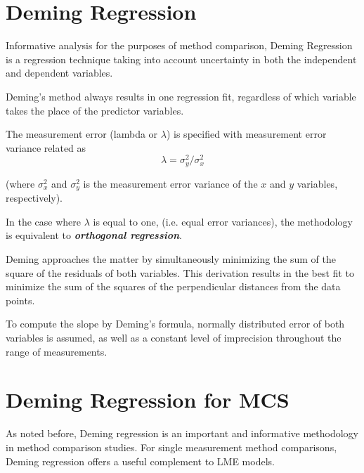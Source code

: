 \documentclass[12pt, a4paper]{report}
\theoremstyle{plain}
\theoremstyle{definition}
\theoremstyle{remark}
\begin{document}
\section{Deming Regression}

Informative analysis for the purposes of method comparison, Deming Regression is a regression technique taking into account uncertainty in both the independent and dependent variables.

Deming’s method always results in one regression fit, regardless of which variable takes the place of the predictor variables.
	
	
	
 The measurement error (lambda or $\lambda$) is specified with measurement error variance related as 
	\[\lambda = \sigma^2_y/\sigma^2_x\]
	
	(where $\sigma^2_x$ and $\sigma^2_y$ is the measurement error variance of the $x$ and $y$ variables, respectively).
	
In the case where $\lambda$ is equal to one, (i.e. equal error variances), the methodology is equivalent to \textit{\textbf{orthogonal regression}}.
	
Deming approaches the matter by simultaneously minimizing the sum of the square of the residuals of both variables. This derivation results in the best fit to minimize the sum of the squares of the perpendicular distances from the data points.
	
 To compute the slope by Deming’s formula,  normally distributed error of both variables  is assumed, as well as a constant level of imprecision throughout the range of measurements.
	



\section{Deming Regression for MCS}
As noted before, Deming regression is an important and informative methodology in method comparison studies.
For single measurement method comparisons, Deming regression offers a useful complement to LME models.
\end{document}
